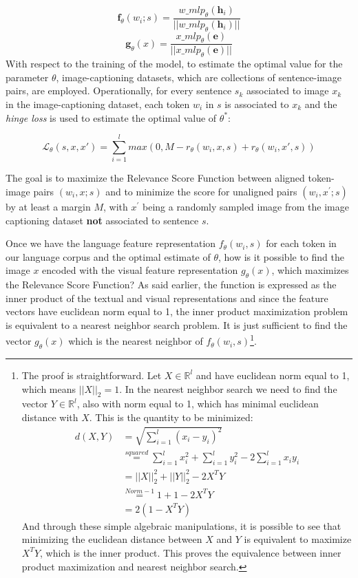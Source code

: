 \documentclass[
]{krantz}
\begin{document}
\[ \textbf{f}_{\theta}(w_{i};s)= \frac{w{\_}mlp_{\theta}(\textbf{h}_{i})}{||w{\_}mlp_{\theta}(\textbf{h}_{i})||} \]
\[ \textbf{g}_{\theta}(x)= \frac{x{\_}mlp_{\theta}(\textbf{e})}{||x{\_}mlp_{\theta}(\textbf{e})||} \]
With respect to the training of the model, to estimate the optimal value for the parameter \(\theta\), image-captioning datasets, which are collections of sentence-image pairs, are employed. Operationally, for every sentence \(s_k\) associated to image \(x_k\) in the image-captioning dataset, each token \(w_i\) in \(s\) is associated to \(x_k\) and the \emph{hinge loss} is used to estimate the optimal value of \(\theta^*\):

\[ \mathcal{L}_{\theta}(s,x,x')=\sum_{i=1}^{l}max(0,M-r_{\theta}(w_{i},x,s)+r_{\theta}(w_{i},x',s))\]

The goal is to maximize the Relevance Score Function between aligned token-image pairs \((w_i,x;s)\) and to minimize the score for unaligned pairs \((w_i,x^{'};s)\) by at least a margin \(M\), with \(x^{'}\) being a randomly sampled image from the image captioning dataset \textbf{not} associated to sentence \(s\).

Once we have the language feature representation \(f_{\theta}(w_i,s)\) for each token in our language corpus and the optimal estimate of \(\theta\), how is it possible to find the image \(x\) encoded with the visual feature representation \(g_{\theta}(x)\), which maximizes the Relevance Score Function? As said earlier, the function is expressed as the inner product of the textual and visual representations and since the feature vectors have euclidean norm equal to 1, the inner product maximization problem is equivalent to a nearest neighbor search problem. It is just sufficient to find the vector \(g_{\theta}(x)\) which is the nearest neighbor of \(f_{\theta}(w_i,s)\)\footnote{The proof is straightforward. Let \(X\in \mathbb{R}^l\) and have euclidean norm equal to 1, which means \(||X||_{2}=1\). In the nearest neighbor search we need to find the vector \(Y\in \mathbb{R}^l\), also with norm equal to 1, which has minimal euclidean distance with \(X\). This is the quantity to be minimized:
  \begin{align*}
  d(X,Y) &=\sqrt{\sum_{i=1}^{l}{(x_i-y_i)^2}}
    \\&\stackrel{squared}{=} \sum_{i=1}^{l}{x_i^2}+\sum_{i=1}^{l}{y_i^2}-2\sum_{i=1}^{l}{x_iy_i}
    \\&\stackrel{}{=}||X||_{2}^2+||Y||_2^2-2X^TY
    \\&\stackrel{Norm-1}{=}1+1-2X^TY
    \\&\stackrel{}{=}2(1-X^TY)
  \end{align*}
  And through these simple algebraic manipulations, it is possible to see that minimizing the euclidean distance between \(X\) and \(Y\) is equivalent to maximize \(X^TY\), which is the inner product. This proves the equivalence between inner product maximization and nearest neighbor search.}.
\end{document}
